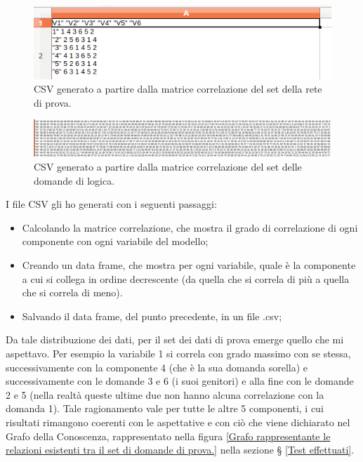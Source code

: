 \begin{figure}[H]
\centering
	\includegraphics[width=0.60\linewidth]{../../PCA/plot/CSV_rete-prova.png}
	\caption{CSV generato a partire dalla matrice correlazione del set della rete di prova.}
	\label{CSV generato a partire dalla matrice correlazione del set della rete di prova.}
\end{figure}
\begin{figure}[H]
\centering
	\includegraphics[width=1\linewidth]{../../PCA/plot/CSV_rete-db.png}
	\caption{CSV generato a partire dalla matrice correlazione del set delle domande di logica.}
	\label{CSV generato a partire dalla matrice correlazione del set delle domande nel database.}
\end{figure}
\noindent
I file CSV gli ho generati con i seguenti passaggi:
\begin{itemize}
\item Calcolando la matrice correlazione, che mostra il grado di correlazione di ogni componente con ogni variabile del modello;
\item Creando un data frame, che mostra per ogni variabile, quale \`e la componente a cui si collega in ordine decrescente (da  quella che si correla di pi\`u a quella che si correla di meno).
\item Salvando il data frame, del punto precedente, in un file .csv;
\end{itemize}
\noindent
Da tale distribuzione dei dati, per il set dei dati di prova emerge quello che mi aspettavo. Per esempio la variabile 1 si correla con grado massimo con se stessa, successivamente con la componente 4 (che \`e la sua domanda sorella) e successivamente con le domande 3 e 6 (i suoi genitori) e alla fine con le domande 2 e 5 (nella realt\`a queste ultime due non hanno alcuna correlazione con la domanda 1). Tale ragionamento vale per tutte le altre  5 componenti, i cui risultati rimangono coerenti con le aspettative e con ci\`o che viene dichiarato nel Grafo della Conoscenza, rappresentato nella figura \ref{Grafo rappresentante le relazioni esistenti tra il set di domande di prova.} nella sezione § \ref{Test effettuati}.\\\\
